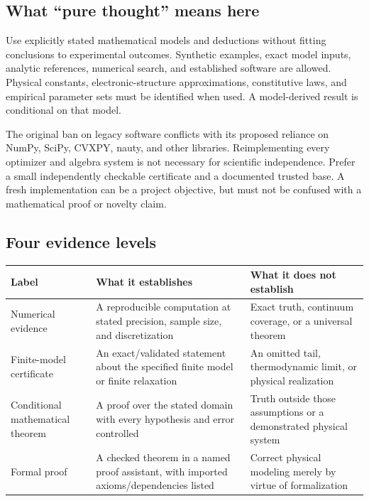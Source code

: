 \documentclass[
  11pt,
]{article}
\newcounter{none} %
\begin{document}
\subsection{What ``pure thought'' means here}

Use explicitly stated mathematical models and deductions without fitting
conclusions to experimental outcomes. Synthetic examples, exact model
inputs, analytic references, numerical search, and established software
are allowed. Physical constants, electronic-structure approximations,
constitutive laws, and empirical parameter sets must be identified when
used. A model-derived result is conditional on that model.

The original ban on legacy software conflicts with its proposed reliance
on NumPy, SciPy, CVXPY, nauty, and other libraries. Reimplementing every
optimizer and algebra system is not necessary for scientific
independence. Prefer a small independently checkable certificate and a
documented trusted base. A fresh implementation can be a project
objective, but must not be confused with a mathematical proof or novelty
claim.

\subsection{Four evidence levels}

{\def\LTcaptype{none} %
\begin{longtable}[]{@{}
  >{\raggedright\arraybackslash}p{}
  >{\raggedright\arraybackslash}p{}
  >{\raggedright\arraybackslash}p{}@{}}
\toprule\noalign{}
\begin{minipage}[b]{\linewidth}\raggedright
Label
\end{minipage} & \begin{minipage}[b]{\linewidth}\raggedright
What it establishes
\end{minipage} & \begin{minipage}[b]{\linewidth}\raggedright
What it does not establish
\end{minipage} \\
\midrule\noalign{}
\endhead
\bottomrule\noalign{}
\endlastfoot
Numerical evidence & A reproducible computation at stated precision,
sample size, and discretization & Exact truth, continuum coverage, or a
universal theorem \\
Finite-model certificate & An exact/validated statement about the
specified finite model or finite relaxation & An omitted tail,
thermodynamic limit, or physical realization \\
Conditional mathematical theorem & A proof over the stated domain with
every hypothesis and error controlled & Truth outside those assumptions
or a demonstrated physical system \\
Formal proof & A checked theorem in a named proof assistant, with
imported axioms/dependencies listed & Correct physical modeling merely
by virtue of formalization \\
\end{longtable}
}
\end{document}
